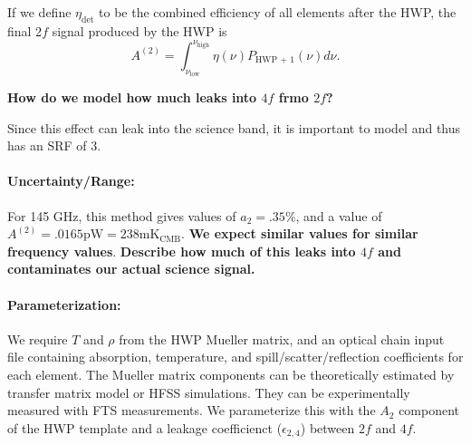 If we define $\eta_\text{det}$ to be the combined efficiency of all elements after the HWP,
the final 2$f$ signal produced by the HWP is 
\[
A^{(2)} = \int_{\nu_\text{low}}^{\nu_\text{high}} \eta(\nu) P_\text{HWP + 1}(\nu) d\nu.
\]

\textbf{How do we model how much leaks into $4f$ frmo $2f$?}

Since this effect can leak into the science band, it is important to model and thus has an SRF of 3.
\paragraph{Uncertainty/Range:}
For 145 GHz, this method gives values of $a_2 = .35\%$, and a value of 
$A^{(2)} = .0165 \text{pW} = 238 \text{mK}_\text{CMB}$. 
\textbf{We expect similar values for similar frequency values}.
\textbf{Describe how much of this leaks into $4f$ and contaminates our actual science signal.}

\paragraph{Parameterization:}
We require $T$ and $\rho$ from the HWP Mueller matrix\cite{Salatino16}, and an optical chain input file containing
absorption, temperature, and spill/scatter/reflection coefficients for each element. The Mueller matrix components can be theoretically estimated by transfer matrix model \cite{Essinger-Hileman13} or HFSS simulations. They can be experimentally measured with FTS measurements. We parameterize this with the $A_2$ component of the HWP template and a leakage coefficienct ($\epsilon_{2,4}$) between $2f$ and $4f$.

